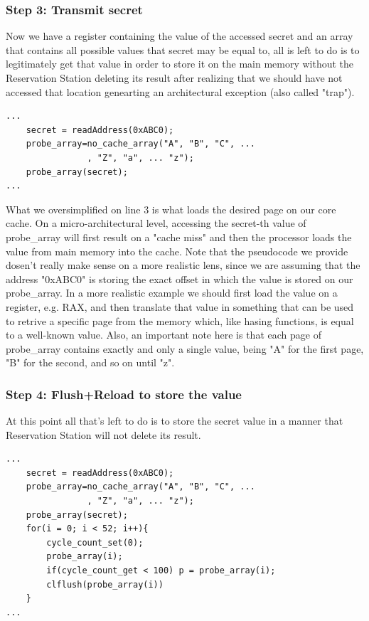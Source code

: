 \subsubsection{Step 3: Transmit secret}
Now we have a register containing the value of the accessed secret and an array that contains all possible values that secret may be equal to,
all is left to do is to legitimately get that value in order to store it on the main memory without the Reservation Station deleting its result
after realizing that we should have not accessed that location genearting an architectural exception (also called "trap").
\begin{verbatim}
...
    secret = readAddress(0xABC0);
    probe_array=no_cache_array("A", "B", "C", ... 
                , "Z", "a", ... "z");
    probe_array(secret);
...
\end{verbatim}

What we oversimplified on line 3 is what loads the desired page on our core cache. On a micro-architectural level, accessing the secret-th value of probe\_array
will first result on a "cache miss" and then the processor loads the value from main memory into the cache.
Note that the pseudocode we provide dosen't really make sense on a more realistic lens, since we are assuming that the address "0xABC0" is storing the exact
offset in which the value is stored on our probe\_array. In a more realistic example we should first load the value on a register, e.g. RAX,
and then translate that value in something that can be used to retrive a specific page from the memory which,
like hasing functions, is equal to a well-known value. Also, an important note here is that each page
of probe\_array contains exactly and only a single value, being "A" for the first page, "B" for the second, and so on until "z".

\subsubsection{Step 4: Flush+Reload to store the value}
At this point all that's left to do is to store the secret value in a manner that Reservation Station will not delete its result.
\begin{verbatim}
...
    secret = readAddress(0xABC0);
    probe_array=no_cache_array("A", "B", "C", ... 
                , "Z", "a", ... "z");
    probe_array(secret);
    for(i = 0; i < 52; i++){
        cycle_count_set(0);
        probe_array(i);
        if(cycle_count_get < 100) p = probe_array(i);
        clflush(probe_array(i))
    }
...
\end{verbatim}

